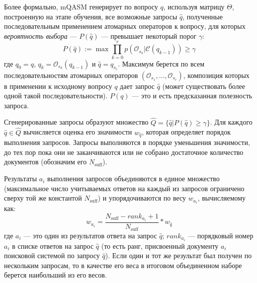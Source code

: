 \documentclass{article}
\begin{document}


Более формально, mQASM генерирует по вопросу  $q$,
используя матрицу $\Theta$, построенную на этапе обучения,
все возможные запросы $\hat{q}$,
полученные последовательным применением атомарных операторов
к вопросу,
для которых {\em вероятность выбора} --- $P(\hat{q})$ ---
превышает некоторый порог $\gamma$: 
\begin{equation}\label{eq:pdef}
P(\hat{q}):=\max \prod_{k=0}^r p(\mathcal{O}_{s_k}|\mathcal{C}(q_{k-1})) \geq \gamma
\end{equation}
где $q_0 = q$, $q_{k}=\mathcal{O}_{s_k}(q_{k-1})$ и $\hat{q}=q_{s_r}$.
Максимум берется по всем последовательностям атомарных операторов
$(\mathcal{O}_{s_1},\ldots,\mathcal{O}_{s_r})$,
композиция которых в применении к исходному вопросу $q$
дает запрос $\hat{q}$ (может существовать более
одной такой последовательности).
$P(q)$ --- это и есть предсказанная полезность запроса.

Сгенерированные запросы образуют множество $\hat{Q}=\{\hat{q} | P(\hat{q})\geq\gamma\}$.
Для каждого $\hat{q} \in \hat{Q}$ вычисляется оценка его значимости $w_{\hat{q}}$,
которая определяет порядок выполнения запросов.
Запросы выполняются в порядке уменьшения значимости, до тех пор пока они не 
заканчиваются или не собрано достаточное количество документов (обозначим его $N_{\text{suff}}$).

Результаты $a_i$ выполнения запросов 
объединяются в единое множество 
(максимальное число учитываемых ответов на
каждый из запросов ограничено сверху той же константой $N_{\text{suff}}$)
и упорядочиваются по весу $w_{a_i}$, вычисляемому как: 
\[
w_{a_i} = \frac{N_{\text{suff}}-\mathit{rank}_{a_{i}}+1}{N_{\text{suff}}} * w_{\hat{q}}
\]
где $a_{i}$ --- это один из результатов ответа на запрос $\hat{q}$;
$rank_{a_i}$ --- порядковый номер $a_i$ в списке ответов на запрос $\hat{q}$
(то есть ранг, присвоенный документу $a_i$ поисковой системой по запросу $\hat{q}$).
Если один и тот же результат был получен по нескольким запросам,
то в качестве его веса в итоговом объединенном наборе берется наибольший из его весов.
\end{document}
